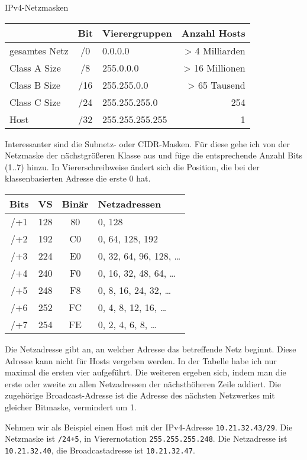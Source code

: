 \begin{normaltext}
\begin{Exkursbox}{IPv4-Netzmasken}
  \begin{tabular}{l|c|l|r}
    & Bit & Vierergruppen & Anzahl Hosts \\
    \hline
    gesamtes Netz & /0 & 0.0.0.0 & > 4 Milliarden \\
    Class A Size & /8 & 255.0.0.0 & > 16 Millionen \\
    Class B Size & /16 & 255.255.0.0 & > 65 Tausend \\
    Class C Size & /24 & 255.255.255.0 & 254 \\
    Host & /32 & 255.255.255.255 & 1 \\
  \end{tabular}

  Interessanter sind die Subnetz- oder CIDR-Masken. Für diese gehe ich von der
  Netzmaske der nächstgrößeren Klasse aus und füge die entsprechende Anzahl
  Bits (1..7) hinzu. In Viererschreibweise ändert sich die Position, die bei
  der klassenbasierten Adresse die erste 0 hat.

  \begin{tabular}{c|c|c|l}
    Bits & VS & Binär & Netzadressen \\
    \hline
    /+1 & 128 & 80 & 0, 128 \\
    /+2 & 192 & C0 & 0, 64, 128, 192 \\
    /+3 & 224 & E0 & 0, 32, 64, 96, 128, \ldots \\
    /+4 & 240 & F0 & 0, 16, 32, 48, 64, \ldots \\
    /+5 & 248 & F8 & 0, 8, 16, 24, 32, \ldots \\
    /+6 & 252 & FC & 0, 4, 8, 12, 16, \ldots \\
    /+7 & 254 & FE & 0, 2, 4, 6, 8, \ldots \\
  \end{tabular}

  Die Netzadresse gibt an, an welcher Adresse das betreffende Netz beginnt.
  Diese Adresse kann nicht für Hosts vergeben werden. In der Tabelle habe ich
  nur maximal die ersten vier aufgeführt. Die weiteren ergeben sich, indem man
  die erste oder zweite zu allen Netzadressen der nächsthöheren Zeile addiert.
  Die zugehörige Broadcast-Adresse ist die Adresse des nächsten Netzwerkes mit
  gleicher Bitmaske, vermindert um 1.

  Nehmen wir als Beispiel einen Host mit der IPv4-Adresse
  \verb?10.21.32.43/29?. Die Netzmaske ist \verb?/24+5?, in Vierernotation
  \verb?255.255.255.248?. Die Netzadresse ist \verb?10.21.32.40?, die
  Broadcastadresse ist \verb?10.21.32.47?.
\end{Exkursbox}


\end{normaltext}
